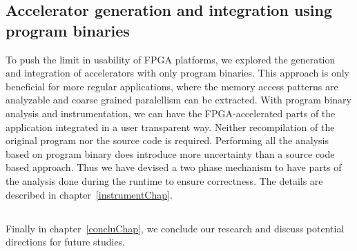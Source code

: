 \subsection{Accelerator generation and integration using program binaries}
To push the limit in usability of FPGA platforms, we explored the generation and 
integration of accelerators with only program binaries. 
This approach is only beneficial for more regular applications,
where the memory access patterns are analyzable and coarse grained paralellism can be extracted.
With program binary analysis and instrumentation, we can have the FPGA-accelerated parts of the application
integrated in a user transparent way. Neither recompilation of the original program nor the source code
is required. Performing all the analysis based on program binary does introduce more uncertainty
than a source code based approach. Thus we have devised a two phase mechanism to have parts of the 
analysis done during the runtime to ensure correctness. The details are described
in chapter~\ref{instrumentChap}. 

\subsection{}
\vspace{-30.0pt}
Finally in chapter~\ref{concluChap}, we conclude our research and discuss potential directions for
future studies. 

